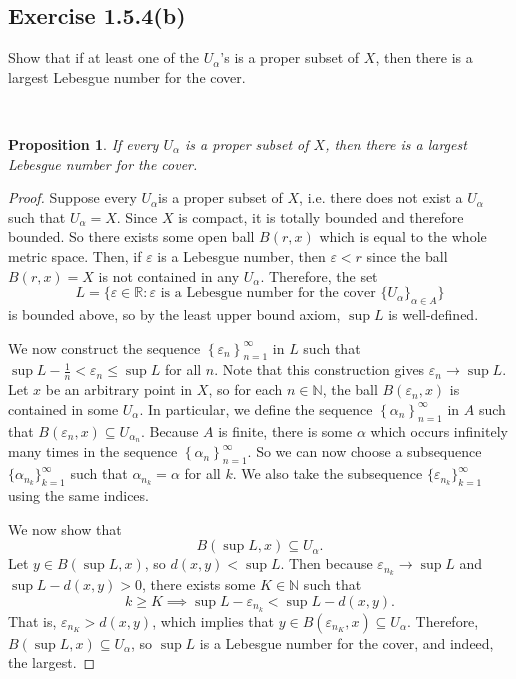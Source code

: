 \documentclass[12pt]{article}
\newcommand{\N}{\mathbb{N}}
\newcommand{\R}{\mathbb{R}}
\newcommand{\eps}{\varepsilon}
\newenvironment{problem}
    {\begin{lrbox}{\mybox}\begin{minipage}{\textwidth-10pt}}
    {\end{minipage}\end{lrbox}\framebox[6.5in]{\usebox{\mybox}}\\}
\newtheorem{proposition}{Proposition}
\newcommand{\seq}[1]{\left\{#1\right\}_{n=1}^\infty}
\begin{document}
\subsection*{Exercise 1.5.4(b)}
\begin{problem}
    Show that if at least one of the $U_\alpha$'s is a proper subset of $X$, then there is a largest Lebesgue number for the cover.
\end{problem}

\begin{proposition}
    If every $U_\alpha$ is a proper subset of $X$, then there is a largest Lebesgue number for the cover.
\end{proposition}

\begin{proof}
    Suppose every $U_\alpha$is a proper subset of $X$, i.e. there does not exist a $U_\alpha$ such that $U_\alpha = X$. Since $X$ is compact, it is totally bounded and therefore bounded. So there exists some open ball $B(r,x)$ which is equal to the whole metric space. Then, if $\eps$ is a Lebesgue number, then $\eps<r$ since the ball $B(r,x)=X$ is not contained in any $U_\alpha$. Therefore, the set
    \[L = \{\eps\in\R : \eps \text{ is a Lebesgue number for the cover } \{U_\alpha\}_{\alpha\in A}\}\]
    is bounded above, so by the least upper bound axiom, $\sup L$ is well-defined.
    
    We now construct the sequence $\seq{\eps_n}$ in $L$ such that $\sup L - \frac1n< \eps_n \leq \sup L$ for all $n$. Note that this construction gives $\eps_n \to \sup L$. Let $x$ be an arbitrary point in $X$, so for each $n\in\N$, the ball $B(\eps_n, x)$ is contained in some $U_\alpha$. In particular, we define the sequence $\seq{\alpha_n}$ in $A$ such that $B(\eps_n, x)\subseteq U_{\alpha_n}$. Because $A$ is finite, there is some $\alpha$ which occurs infinitely many times in the sequence $\seq{\alpha_n}$. So we can now choose a subsequence $\{\alpha_{n_k}\}_{k=1}^\infty$ such that $\alpha_{n_k}=\alpha$ for all $k$. We also take the subsequence $\{\eps_{n_k}\}_{k=1}^\infty$ using the same indices.
    
    We now show that
    \[B(\sup L, x) \subseteq U_\alpha.\]
    Let $y\in B(\sup L, x)$, so $d(x,y) < \sup L$. Then because $\eps_{n_k} \to \sup L$ and $\sup L - d(x,y)>0$, there exists some $K\in\N$ such that
    \[k\geq K \implies \sup L - \eps_{n_k} < \sup L - d(x,y).\]
    That is, $\eps_{n_K} > d(x,y)$, which implies that $y\in B(\eps_{n_K}, x)\subseteq U_\alpha$. Therefore, $B(\sup L, x)\subseteq U_\alpha$, so $\sup L$ is a Lebesgue number for the cover, and indeed, the largest. 
    
\end{proof}
\end{document}

